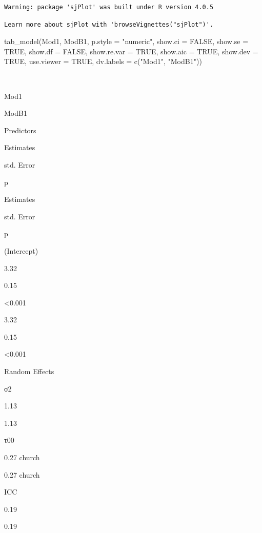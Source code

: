 \documentclass[
  english,
]{book}
\newenvironment{Shaded}{\begin{snugshade}}{\end{snugshade}}
\newcommand{\AttributeTok}[1]{\textcolor[rgb]{0.77,0.63,0.00}{#1}}
\newcommand{\ConstantTok}[1]{\textcolor[rgb]{0.00,0.00,0.00}{#1}}
\newcommand{\FunctionTok}[1]{\textcolor[rgb]{0.00,0.00,0.00}{#1}}
\newcommand{\NormalTok}[1]{#1}
\newcommand{\StringTok}[1]{\textcolor[rgb]{0.31,0.60,0.02}{#1}}
\begin{document}
\begin{verbatim}
Warning: package 'sjPlot' was built under R version 4.0.5
\end{verbatim}

\begin{verbatim}
Learn more about sjPlot with 'browseVignettes("sjPlot")'.
\end{verbatim}

\begin{Shaded}
\begin{Highlighting}[]
\FunctionTok{tab\_model}\NormalTok{(Mod1, ModB1, }\AttributeTok{p.style =} \StringTok{"numeric"}\NormalTok{, }\AttributeTok{show.ci =} \ConstantTok{FALSE}\NormalTok{, }\AttributeTok{show.se =} \ConstantTok{TRUE}\NormalTok{, }\AttributeTok{show.df =} \ConstantTok{FALSE}\NormalTok{, }\AttributeTok{show.re.var =} \ConstantTok{TRUE}\NormalTok{, }\AttributeTok{show.aic =} \ConstantTok{TRUE}\NormalTok{, }\AttributeTok{show.dev =} \ConstantTok{TRUE}\NormalTok{, }\AttributeTok{use.viewer =} \ConstantTok{TRUE}\NormalTok{, }\AttributeTok{dv.labels =} \FunctionTok{c}\NormalTok{(}\StringTok{"Mod1"}\NormalTok{, }\StringTok{"ModB1"}\NormalTok{))}
\end{Highlighting}
\end{Shaded}

~

Mod1

ModB1

Predictors

Estimates

std. Error

p

Estimates

std. Error

p

(Intercept)

3.32

0.15

\textless0.001

3.32

0.15

\textless0.001

Random Effects

σ2

1.13

1.13

τ00

0.27 church

0.27 church

ICC

0.19

0.19
\end{document}
